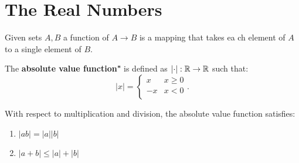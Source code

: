 


\section{The Real Numbers}
\begin{definition}
	Given sets $A, B$ a function of $A \to B$ is a mapping that takes ea    ch element of $A$ to a single element of $B$.
\end{definition}

\begin{definition}
	The \textbf{absolute value function"} is defined as $\left|\cdot\right|: \mathbb{R} \to \mathbb{R}$ such that:
	\[
		\left|x\right| =
		\begin{cases} 
		      x & x \ge  0 \\
		      -x & x < 0 \\
   		\end{cases}
	.\] 
\end{definition}

\begin{theorem}
	With respect to multiplication and division, the absolute value function satisfies:
	\begin{enumerate}
		\item $\left|ab\right| = \left|a\right|\left|b\right|$
		\item $\left|a+b\right| \le \left|a\right| + \left|b\right|$
	\end{enumerate}
\end{theorem}

